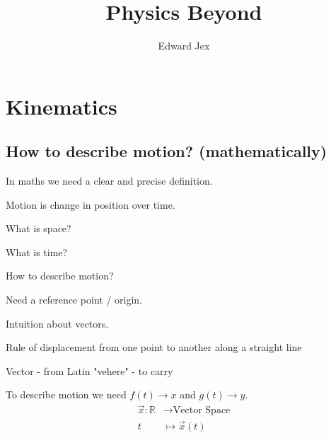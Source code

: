 \documentclass[a4paper,12pt]{article}
\begin{document}
\title{Physics Beyond}	
\author{Edward Jex}
\maketitle
\section*{Kinematics}
\subsection*{How to describe motion? (mathematically)}
\begin{list1}
	\item In maths we need a clear and precise definition.
	\item Motion is change in position over time.
	\begin{list2}
		\item What is space?
		\item What is time?
	\end{list2}
	\item How to describe motion?
	\begin{list2}
		\item Need a reference point / origin.
		\item Intuition about vectors.
		\begin{listHook}
			\item Rule of displacement from one point to another along a straight line
			\item Vector - from Latin "vehere" - to carry
		\end{listHook}
	\end{list2}
\end{list1}
To describe motion we need $f(t) \rightarrow x$ and $g(t) \rightarrow y$.
\begin{align*}
\vec{x}: \mathbb{R} & \rightarrow \text{Vector Space} \\
t & \mapsto \vec{x}(t) \\
\end{align*} 
\end{document}
